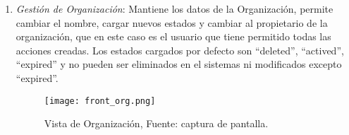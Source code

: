 \begin{enumerate}
  \item \textit{Gestión de Organización}: Mantiene los datos de la Organización, permite cambiar el nombre, cargar nuevos estados y cambiar al propietario de la organización, que 
  en este caso es el usuario que tiene permitido todas las acciones creadas.
  Los estados cargados por defecto son “deleted”, “actived”, “expired” y no pueden ser eliminados en el sistemas  ni modificados excepto “expired”. 

  \begin{figure}[H]
    \centering
    {\texttt{[image: front\_org.png]}}
    \caption{Vista de Organización,  Fuente: captura de pantalla. }
    \label{img:front_org}
  \end{figure}
\end{enumerate}


